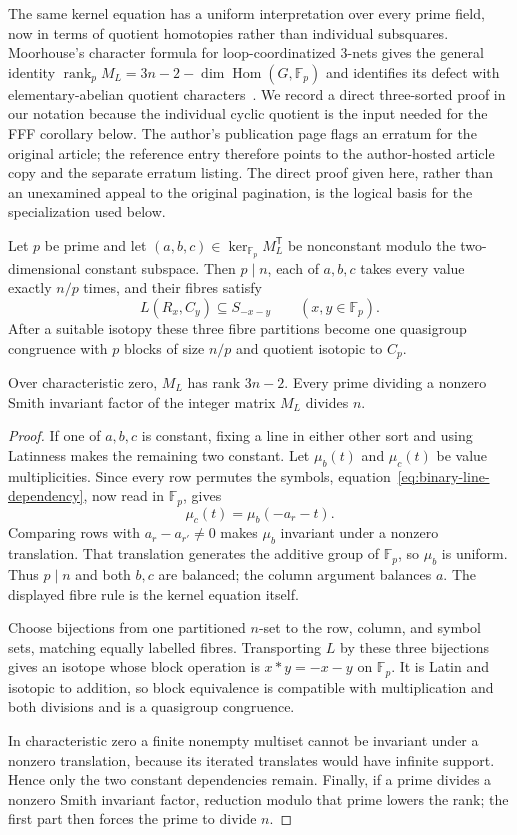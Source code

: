 The same kernel equation has a uniform interpretation over every prime
field, now in terms of quotient homotopies rather than individual
subsquares.  Moorhouse's character formula for loop-coordinatized
$3$-nets gives the general identity
$\operatorname{rank}_{p}M_L=3n-2-\dim\operatorname{Hom}(G,\mathbb F_p)$
and identifies its defect with elementary-abelian quotient
characters~\cite[Theorem~4.2]{Moorhouse1991BruckNets}.  We record a direct
three-sorted proof in our notation because the individual cyclic quotient is
the input needed for the FFF corollary below.
The author's publication page flags an erratum for the original article; the
reference entry therefore points to the author-hosted article copy and the
separate erratum listing.  The direct proof given here, rather than an unexamined appeal
to the original pagination, is the logical basis for the specialization used
below.

\begin{theorem}
\label{thm:prime-field-line-quotients}
Let $p$ be prime and let
$(a,b,c)\in\ker_{\mathbb F_p}M_L^{\mathsf T}$ be nonconstant modulo the
two-dimensional constant subspace.  Then $p\mid n$, each of $a,b,c$ takes
every value exactly $n/p$ times, and their fibres satisfy
\[
 L(R_x,C_y)\subseteq S_{-x-y}\qquad(x,y\in\mathbb F_p).
\]
After a suitable isotopy these three fibre partitions become one quasigroup
congruence with $p$ blocks of size $n/p$ and quotient isotopic to $C_p$.

Over characteristic zero, $M_L$ has rank $3n-2$.  Every prime dividing a
nonzero Smith invariant factor of the integer matrix $M_L$ divides $n$.
\end{theorem}

\begin{proof}
If one of $a,b,c$ is constant, fixing a line in either other sort and using
Latinness makes the remaining two constant.  Let $\mu_b(t)$ and $\mu_c(t)$
be value multiplicities.  Since every row permutes the symbols,
equation~\eqref{eq:binary-line-dependency}, now read in $\mathbb F_p$, gives
\[
 \mu_c(t)=\mu_b(-a_r-t).
\]
Comparing rows with $a_r-a_{r'}\ne0$ makes $\mu_b$ invariant under a nonzero
translation.  That translation generates the additive group of
$\mathbb F_p$, so $\mu_b$ is uniform.  Thus $p\mid n$ and both $b,c$ are
balanced; the column argument balances $a$.  The displayed fibre rule is the
kernel equation itself.

Choose bijections from one partitioned $n$-set to the row, column, and symbol
sets, matching equally labelled fibres.  Transporting $L$ by these three
bijections gives an isotope whose block operation is $x*y=-x-y$ on
$\mathbb F_p$.  It is Latin and isotopic to addition, so block equivalence is
compatible with multiplication and both divisions and is a quasigroup
congruence.

In characteristic zero a finite nonempty multiset cannot be invariant under
a nonzero translation, because its iterated translates would have infinite
support.  Hence only the two constant dependencies remain.  Finally, if a
prime divides a nonzero Smith invariant factor, reduction modulo that prime
lowers the rank; the first part then forces the prime to divide $n$.
\end{proof}


